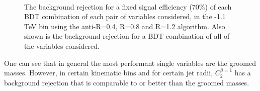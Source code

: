 \begin{figure}
\centering
{}
\\
\caption{The background rejection
for a fixed signal efficiency (70\%) of each BDT combination of
each pair of variables considered, in the -1.1 TeV bin using
the anti-\kT R=0.4, R=0.8 and R=1.2 algorithm. Also shown is the background rejection
for a BDT combination of all of the variables considered.}
\label{fig:pt1000_comb2D}
\end{figure}



One can see that in general the most performant single variables are
the groomed masses. However, in certain kinematic bins and for certain
jet radii, $C_2^{\beta=1}$ has a background rejection that is
comparable to or better than the groomed masses. 

